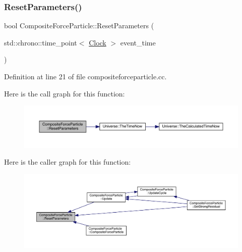 \subsubsection{\texorpdfstring{Reset\+Parameters()}{ResetParameters()}}
{\footnotesize\ttfamily bool Composite\+Force\+Particle\+::\+Reset\+Parameters (\begin{DoxyParamCaption}\item[{std\+::chrono\+::time\+\_\+point$<$ \hyperlink{universe_8h_a0ef8d951d1ca5ab3cfaf7ab4c7a6fd80}{Clock} $>$}]{event\+\_\+time }\end{DoxyParamCaption})}



Definition at line 21 of file compositeforceparticle.\+cc.

Here is the call graph for this function\+:\nopagebreak
\begin{figure}[H]
\begin{center}
\leavevmode
\includegraphics[width=350pt]{class_composite_force_particle_ab4767179e32f6d2b4b31941dd3c48b10_cgraph}
\end{center}
\end{figure}
Here is the caller graph for this function\+:
\nopagebreak
\begin{figure}[H]
\begin{center}
\leavevmode
\includegraphics[width=350pt]{class_composite_force_particle_ab4767179e32f6d2b4b31941dd3c48b10_icgraph}
\end{center}
\end{figure}
\mbox{\label{class_composite_force_particle_a41cee6bd5a75fbf67fa6e76a9e7d7605}} 
